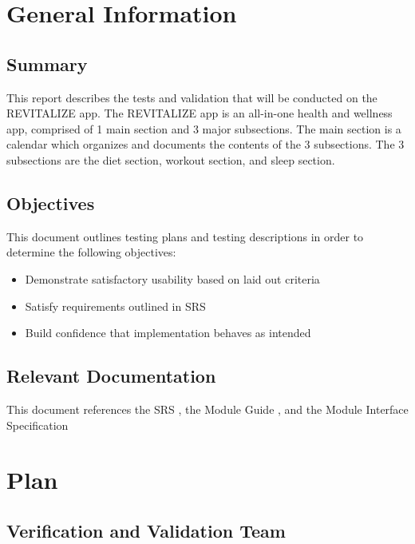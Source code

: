 \documentclass[12pt, titlepage]{article}
\begin{document}
\section{General Information}

\subsection{Summary}

\noindent This report describes the tests and validation that will be conducted on the REVITALIZE app. The REVITALIZE app is an all-in-one health and wellness app, comprised of 1 main section and 3 major subsections. The main section is a calendar which organizes and documents the contents of the 3 subsections. The 3 subsections are the diet section, workout section, and sleep section.

\subsection{Objectives}

\noindent This document outlines testing plans and testing descriptions in order to determine the following objectives: 
\begin{itemize}
	\item Demonstrate satisfactory usability based on laid out criteria
	\item Satisfy requirements outlined in SRS
	\item Build confidence that implementation behaves as intended
\end{itemize}
 

\subsection{Relevant Documentation}

\noindent This document references the SRS \citet{SRS}, the Module Guide \citet{MG}, and the Module Interface Specification \citet{MIS}


\section{Plan}


\subsection{Verification and Validation Team}
\end{document}
